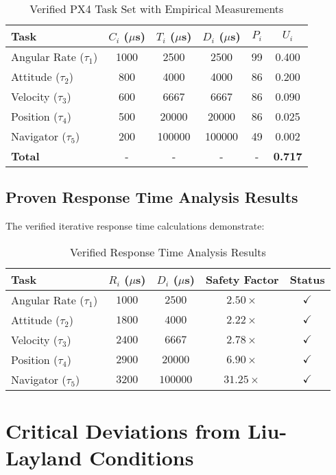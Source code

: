 \documentclass[12pt,a4paper]{article}
\begin{document}
\begin{table}[H]
\centering
\begin{tabular}{|l|c|c|c|c|c|}
\hline
\textbf{Task} & \textbf{$C_i$ ($\mu$s)} & \textbf{$T_i$ ($\mu$s)} & \textbf{$D_i$ ($\mu$s)} & \textbf{$P_i$} & \textbf{$U_i$} \\
\hline
Angular Rate ($\tau_1$) & 1000 & 2500 & 2500 & 99 & 0.400 \\
Attitude ($\tau_2$) & 800 & 4000 & 4000 & 86 & 0.200 \\
Velocity ($\tau_3$) & 600 & 6667 & 6667 & 86 & 0.090 \\
Position ($\tau_4$) & 500 & 20000 & 20000 & 86 & 0.025 \\
Navigator ($\tau_5$) & 200 & 100000 & 100000 & 49 & 0.002 \\
\hline
\textbf{Total} & - & - & - & - & \textbf{0.717} \\
\hline
\end{tabular}
\caption{Verified PX4 Task Set with Empirical Measurements}
\end{table}

\subsection{Proven Response Time Analysis Results}

The verified iterative response time calculations demonstrate:

\begin{table}[H]
\centering
\begin{tabular}{|l|c|c|c|c|}
\hline
\textbf{Task} & \textbf{$R_i$ ($\mu$s)} & \textbf{$D_i$ ($\mu$s)} & \textbf{Safety Factor} & \textbf{Status} \\
\hline
Angular Rate ($\tau_1$) & $1000$ & $2500$ & $2.50\times$ & $\checkmark$ \\
Attitude ($\tau_2$) & $1800$ & $4000$ & $2.22\times$ & $\checkmark$ \\
Velocity ($\tau_3$) & $2400$ & $6667$ & $2.78\times$ & $\checkmark$ \\
Position ($\tau_4$) & $2900$ & $20000$ & $6.90\times$ & $\checkmark$ \\
Navigator ($\tau_5$) & $3200$ & $100000$ & $31.25\times$ & $\checkmark$ \\
\hline
\end{tabular}
\caption{Verified Response Time Analysis Results}
\end{table}

\section{Critical Deviations from Liu-Layland Conditions}
\end{document}
